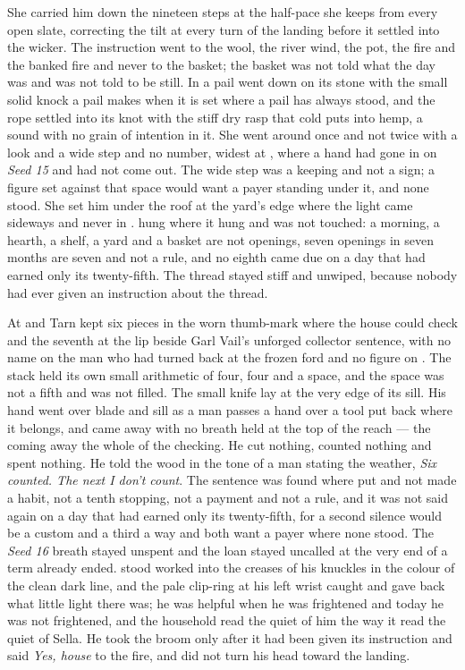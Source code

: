 She carried him down the nineteen steps at the half-pace she keeps from every open slate, correcting the tilt at every turn of the landing before it settled into the wicker. The instruction went to the wool, the river wind, the pot, the fire and the banked fire and never to the basket; the basket was not told what the day was and was not told to be still. In  a pail went down on its stone with the small solid knock a pail makes when it is set where a pail has always stood, and the rope settled into its knot with the stiff dry rasp that cold puts into hemp, a sound with no grain of intention in it. She went around  once and not twice with a look and a wide step and no number, widest at , where a hand had gone in on \emph{Seed 15} and had not come out. The wide step was a keeping and not a sign; a figure set against that space would want a payer standing under it, and none stood. She set him under the roof at the yard's edge where the light came sideways and never in .  hung where it hung and was not touched: a morning, a hearth, a shelf, a yard and a basket are not openings, seven openings in seven months are seven and not a rule, and no eighth came due on a day that had earned only its twenty-fifth. The thread stayed stiff and unwiped, because nobody had ever given an instruction about the thread.

\scenebreak

At  and  Tarn kept six pieces in the worn thumb-mark where the house could check and the seventh at the lip beside Garl Vail's unforged collector sentence, with no name on the man who had turned back at the frozen ford and no figure on . The stack held its own small arithmetic of four, four and a space, and the space was not a fifth and was not filled. The small knife lay at the very edge of its sill. His hand went over blade and sill as a man passes a hand over a tool put back where it belongs, and came away with no breath held at the top of the reach --- the coming away the whole of the checking. He cut nothing, counted nothing and spent nothing. He told the wood in the tone of a man stating the weather, \emph{Six counted. The next I don't count}. The sentence was found where put and not made a habit, not a tenth stopping, not a payment and not a rule, and it was not said again on a day that had earned only its twenty-fifth, for a second silence would be a custom and a third a way and both want a payer where none stood. The \emph{Seed 16} breath stayed unspent and the loan stayed uncalled at the very end of a term already ended.  stood worked into the creases of his knuckles in the colour of the clean dark line, and the pale clip-ring at his left wrist caught and gave back what little light there was; he was helpful when he was frightened and today he was not frightened, and the household read the quiet of him the way it read the quiet of Sella. He took the broom only after it had been given its instruction and said \emph{Yes, house} to the fire, and did not turn his head toward the landing.

